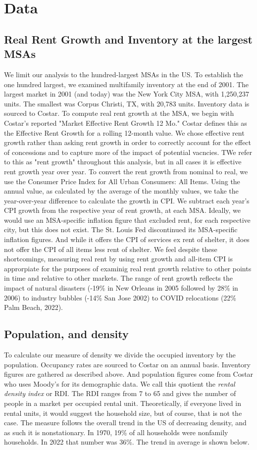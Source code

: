 \documentclass[sn-mathphys-num]{sn-jnl}%
\theoremstyle{thmstyleone}%
\theoremstyle{thmstyletwo}%
\theoremstyle{thmstylethree}%
\begin{document}
\section{Data}
\subsection{Real Rent Growth and Inventory at the largest MSAs}
We limit our analysis to the hundred-largest MSAs in the US. To establish the one hundred largest, we examined multifamily inventory at the end of 2001. The largest market in 2001 (and today) was the New York City MSA, with 1,250,237 units. The smallest was Corpus Christi, TX, with 20,783 units. Inventory data is sourced to Costar. To compute real rent growth at the MSA, we begin with Costar's reported "Market Effective Rent Growth 12 Mo." Costar defines this as the Effective Rent Growth for a rolling 12-month value. We chose effective rent growth rather than asking rent growth in order to correctly account for the effect of concessions and to capture more of the impact of potential vacncies. TWe refer to this as "rent growth" throughout this analysis, but in all cases it is effective rent growth year over year. To convert the rent growth from nominal to real, we use the Consumer Price Index for All Urban Consumers: All Items. Using the annual value, as calculated by the average of the monthly values, we take the year-over-year difference to calculate the growth in CPI. We subtract each year's CPI growth from the respective year of rent growth, at each MSA. Ideally, we would use an MSA-specific inflation figure that excluded rent, for each respective city, but this does not exist. The St. Louis Fed discontinued its MSA-specific inflation figures. And while it offers the CPI of services ex rent of shelter, it does not offer the CPI of all items less rent of shelter. We feel despite these shortcomings, measuring real rent by using rent growth and all-item CPI is approrpiate for the purposes of examinig real rent growth relative to other points in time and relative to other markets. The range of rent growth reflects the impact of natural disasters (-19\% in New Orleans in 2005 followed by 28\% in 2006) to industry bubbles (-14\% San Jose 2002) to COVID relocations (22\% Palm Beach, 2022). 

\subsection{Population, and density}
To calculate our measure of density we divide the occupied inventory by the population. Occupancy rates are sourced to Costar on an annual basis. Inventory figures are gathered as described above. And population figures come from Costar who uses Moody's for its demographic data. We call this quotient the \textit{rental density index} or RDI. The RDI ranges from 7 to 65 and gives the number of people in a market per occupied rental unit. Theoretically, if everyone lived in rental units, it would suggest the household size, but of course, that is not the case. The measure follows the overall trend in the US of decreasing density, and as such it is nonstationary. In 1970, 19\% of all households were nonfamily households. In 2022 that number was 36\%. The trend in average is shown below.
\end{document}
